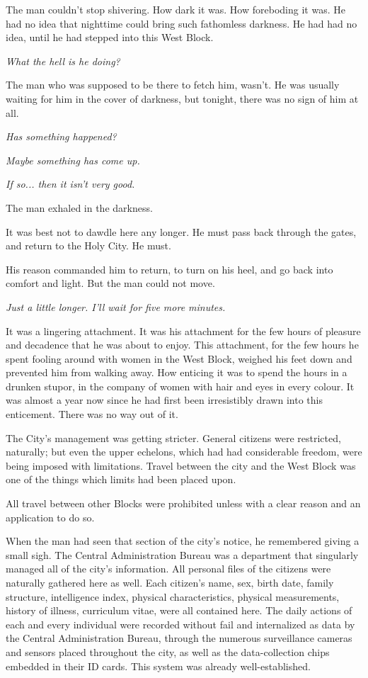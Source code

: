 The man couldn't stop shivering. How dark it was. How foreboding it was.
He had no idea that nighttime could bring such fathomless darkness. He
had had no idea, until he had stepped into this West Block.

\emph{What the hell is he doing?}

The man who was supposed to be there to fetch him, wasn't. He was
usually waiting for him in the cover of darkness, but tonight, there was
no sign of him at all.

\emph{Has something happened?}

\emph{Maybe something has come up.}

\emph{If so... then it isn't very good.}

The man exhaled in the darkness.

It was best not to dawdle here any longer. He must pass back through the
gates, and return to the Holy City. He must.

His reason commanded him to return, to turn on his heel, and go back
into comfort and light. But the man could not move.

\emph{Just a little longer. I'll wait for five more minutes.}

It was a lingering attachment. It was his attachment for the few hours
of pleasure and decadence that he was about to enjoy. This attachment,
for the few hours he spent fooling around with women in the West Block,
weighed his feet down and prevented him from walking away. How enticing
it was to spend the hours in a drunken stupor, in the company of women
with hair and eyes in every colour. It was almost a year now since he
had first been irresistibly drawn into this enticement. There was no way
out of it.

The City's management was getting stricter. General citizens were
restricted, naturally; but even the upper echelons, which had had
considerable freedom, were being imposed with limitations. Travel
between the city and the West Block was one of the things which limits
had been placed upon.

\myspace

All travel between other Blocks were prohibited unless with a clear
reason and an application to do so.

When the man had seen that section of the city's notice, he remembered
giving a small sigh. The Central Administration Bureau was a department
that singularly managed all of the city's information. All personal
files of the citizens were naturally gathered here as well. Each
citizen's name, sex, birth date, family structure, intelligence index,
physical characteristics, physical measurements, history of illness,
curriculum vitae, were all contained here. The daily actions of each and
every individual were recorded without fail and internalized as data by
the Central Administration Bureau, through the numerous surveillance
cameras and sensors placed throughout the city, as well as the
data-collection chips embedded in their ID cards. This system was
already well-established.

